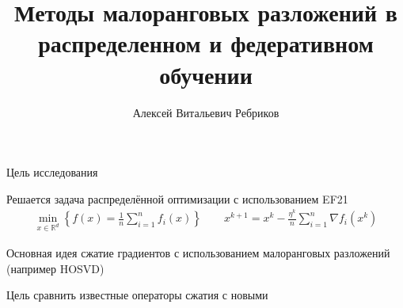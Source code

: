 \documentclass{beamer}
\title[\hbox to 56mm{Малоранговые разложения в распределенном обучении}]{Методы малоранговых разложений в распределенном и федеративном обучении}
\author[А.\,В. Ребриков]{Алексей Витальевич Ребриков}
\institute{Московский физико-технический институт}
\date{\footnotesize
\par\smallskip\emph{Курс:} Автоматизация научных исследований\par (практика, В.\,В.~Стрижов)/Группа 105
\par\smallskip\emph{Эксперт:} к.ф.-м.н. А.\,Н.~Безносиков
\par\smallskip\emph{Консультант:} А.\,В.~Зыль
\par\bigskip\small 2024}
\begin{document}
\begin{frame}
\thispagestyle{empty}
\maketitle
\end{frame}
\newcommand{\R}{\mathbb{R}}
\newcommand{\cC}{\mathcal{C}}
\def\stepsize{\eta}
\begin{frame}{Цель исследования}
\begin{block}{Решается задача}
    распределённой оптимизации с использованием EF21
    \begin{align*}
        \min \limits_{x \in \R^d} \left\{ f(x) = \frac{1}{n} \sum \limits_{i=1}^n f_i(x) \right\}
        \qquad
        x^{k+1} = x^k - \frac{\stepsize^k}{n} \sum \limits_{i=1}^n \nabla f_i(x^k)
    \end{align*} 
\end{block}
\begin{block}{Основная идея}
    сжатие градиентов с использованием малоранговых разложений (например HOSVD)
\end{block}
\begin{block}{Цель}
    сравнить известные операторы сжатия с новыми
\end{block}
\end{frame}
\end{document}
